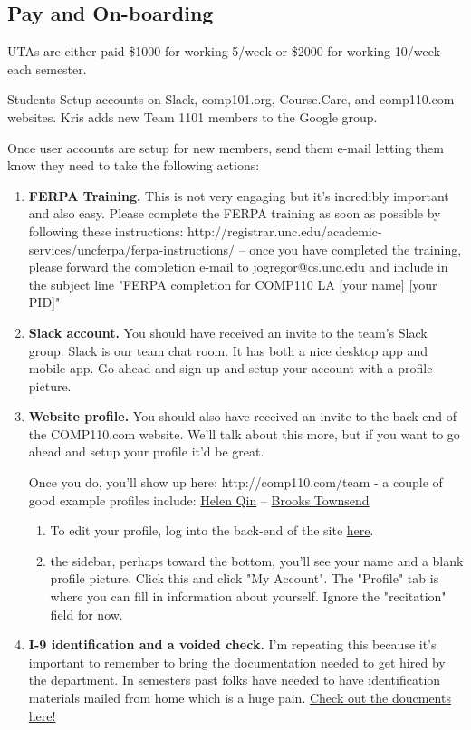 \documentclass[a4paper]{article}
\begin{document}
\subsection{Pay and On-boarding}
UTAs are either paid \$1000 for working 5/week or \$2000 for working 10/week each semester. 
\begin{flushleft}
Students Setup accounts on Slack, comp101.org, Course.Care, and comp110.com websites. Kris adds new Team 1101 members to the Google group. 
\end{flushleft}
\begin{flushleft}
Once user accounts are setup for new members, send them e-mail letting them know they need to take the following actions:
\begin{enumerate}
\item \textbf{FERPA Training.} This is not very engaging but it's incredibly important and also easy. Please complete the FERPA training as soon as possible by following these instructions: http://registrar.unc.edu/academic-services/uncferpa/ferpa-instructions/ -- once you have completed the training, please forward the completion e-mail to jogregor@cs.unc.edu and include in the subject line "FERPA completion for COMP110 LA [your name] [your PID]" 
\item \textbf{Slack account.} You should have received an invite to the team's Slack group. Slack is our team chat room. It has both a nice desktop app and mobile app. Go ahead and sign-up and setup your account with a profile picture.
\item \textbf{Website profile.} You should also have received an invite to the back-end of the COMP110.com website. We'll talk about this more, but if you want to go ahead and setup your profile it'd be great. 
\begin{flushleft} Once you do, you'll show up here: http://comp110.com/team - a couple of good example profiles include: \href{http://comp110.com/team/bio?onyen=zihe}{Helen Qin} -- \href{http://comp110.com/team/bio?onyen=brooksmt}{Brooks Townsend}\end{flushleft}
\begin{enumerate}
\item To edit your profile, log into the back-end of the site \href{http://comp110.com/admin}{here}. 
\item the sidebar, perhaps toward the bottom, you'll see your name and a blank profile picture. Click this and click "My Account". The "Profile" tab is where you can fill in information about yourself. Ignore the "recitation" field for now.
\end{enumerate}
\item \textbf{I-9 identification and a voided check.} I'm repeating this because it's important to remember to bring the documentation needed to get hired by the department. In semesters past folks have needed to have identification materials mailed from home which is a huge pain. \href{https://www.brown.edu/about/administration/human-resources/sites/human-resources/files/acceptable%20documents.pdf}{Check out the doucments here!}
\end{enumerate}
\end{flushleft}
\end{document}
